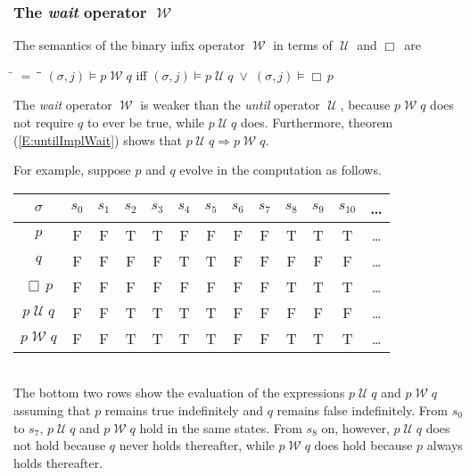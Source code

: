 \documentclass[12pt, fleqn, leqno]{article}
\newcommand{\lllgap}{12pt}                          %
\newcommand{\mymathindent}{24pt}                    %
\newcommand{\impl}{\ensuremath{\Rightarrow}}        %
\newcommand{\Until}{\;\mathcal{U}\;}
\newcommand{\Wait}{\;\mathcal{W}\;}
\newcommand{\Always}{\Box\,}
\newcommand{\myqedtab}{\hspace{384pt}}              %
\begin{document}
\subsubsection*{The \textit{wait} operator $\Wait$}

The semantics of the binary infix operator $\Wait$ in terms of $\Until$ and $\Always$ are
\begin{tabbing}
\hspace{\mymathindent} \= $= \;$ \= \myqedtab \= \kill
  \> $(\sigma, j) \models p \Wait q$ \quad iff \quad $(\sigma, j) \models p \Until q \; \lor \; (\sigma, j) \models \Always p$
\end{tabbing}
The \textit{wait} operator $\Wait$ is weaker than the \textit{until} operator $\Until$, because $p\Wait q$ does not require $q$ to ever be true,
while $p\Until q$ does.
Furthermore, theorem (\ref{E:untilImplWait}) shows that $p \Until q \impl p \Wait q$.

For example, suppose $p$ and $q$ evolve in the computation as follows.\\[\lllgap]
\begin{tabular}{c|cccccccccccc}
  $\sigma$       & $s_0$ & $s_1$ & $s_2$ & $s_3$ & $s_4$ & $s_5$ & $s_6$ & $s_7$ & $s_8$& $s_9$  & $s_{10}$&  \dots \\
  \hline
  $p$            & F     & F     & T     & T     & F     & F     & F     & F     & T     & T     & T     &  \dots\\
  $q$            & F     & F     & F     & F     & T     & T     & F     & F     & F     & F     & F     &  \dots\\
  $\Always p$    & F     & F     & F     & F     & F     & F     & F     & F     & T     & T     & T     &  \dots\\
  $p\Until q$    & F     & F     & T     & T     & T     & T     & F     & F     & F     & F     & F     &  \dots\\
  $p\Wait q$     & F     & F     & T     & T     & T     & T     & F     & F     & T     & T     & T     &  \dots\\
\end{tabular}\\[\lllgap]
The bottom two rows show the evaluation of the expressions $p\Until q$ and $p\Wait q$
assuming that $p$ remains true indefinitely and $q$ remains false indefinitely.
From $s_0$ to $s_7$, $p\Until q$ and $p\Wait q$ hold in the same states.
From $s_8$ on, however, $p\Until q$ does not hold because $q$ never holds thereafter,
while $p\Wait q$ does hold because $p$ always holds thereafter.
\end{document}
